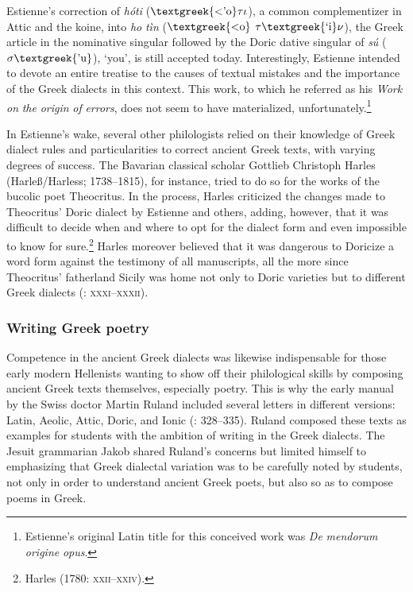 \documentclass[output=paper]{langsci/langscibook}
\begin{document}
Estienne’s correction of \textit{hóti} ($\text{\textgreek{<'o}}\tau \iota $), a common complementizer in Attic and the koine, into \textit{ho} \textit{tìn} ($\text{\textgreek{<o}}$ $\tau \text{\textgreek{`i}}\nu $), the Greek article in the nominative singular followed by the Doric dative singular of \textit{sú} ($\sigma \text{\textgreek{'u}}$), ‘you’, is still accepted today. Interestingly, Estienne intended to devote an entire treatise to the causes of textual mistakes and the importance of the Greek dialects in this context. This work, to which he referred as his \textit{Work} \textit{on} \textit{the} \textit{origin} \textit{of} \textit{errors}, does not seem to have materialized, unfortunately.\footnote{Estienne’s original Latin title for this conceived work was \textit{De} \textit{mendorum} \textit{origine} \textit{opus}.}

In Estienne’s wake, several other philologists relied on their knowledge of Greek dialect rules and particularities to correct ancient Greek texts, with varying degrees of success. The Bavarian classical scholar Gottlieb Christoph Harles (Harleß/Harless; 1738–1815), for instance, tried to do so for the works of the bucolic poet Theocritus. In the process, Harles criticized the changes made to Theocritus’ Doric dialect by Estienne and others, adding, however, that it was difficult to decide when and where to opt for the dialect form and even impossible to know for sure.\footnote{Harles (1780: \textsc{xxii–xxiv}).} Harles moreover believed that it was dangerous to Doricize a word form against the testimony of all manuscripts, all the more since Theocritus’ fatherland Sicily was home not only to Doric varieties but to different Greek dialects (\citealt{Harles1780}: \textsc{xxxi–xxxii}).

\subsubsection{Writing Greek poetry}
\hypertarget{Toc19704823}{}
Competence in the ancient Greek dialects was likewise indispensable for those early modern Hellenists wanting to show off their philological skills by composing ancient Greek texts themselves, especially poetry. This is why the early manual by the Swiss doctor Martin Ruland included several letters in different versions: Latin, Aeolic, Attic, Doric, and Ionic (\citealt{Ruland1556}: 328–335). Ruland composed these texts as examples for students with the ambition of writing in the Greek dialects. The Jesuit grammarian Jakob \citet[35]{Gretser1593} shared Ruland’s concerns but limited himself to emphasizing that Greek dialectal variation was to be carefully noted by students, not only in order to understand ancient Greek poets, but also so as to compose poems in Greek.
\end{document}
